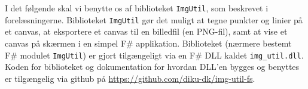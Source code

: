 I det følgende skal vi benytte os af biblioteket \texttt{ImgUtil}, som
beskrevet i forelæsningerne. Biblioteket \texttt{ImgUtil} gør det
muligt at tegne punkter og linier på et canvas, at eksportere et
canvas til en billedfil (en PNG-fil), samt at vise et canvas på
skærmen i en simpel F\# applikation. Biblioteket (nærmere bestemt F\#
modulet \texttt{ImgUtil}) er gjort tilgængeligt via en F\# DLL kaldet
\texttt{img\_util.dll}. Koden for biblioteket og dokumentation for
hvordan DLL'en bygges og benyttes er tilgængelig via github på
\url{https://github.com/diku-dk/img-util-fs}.
